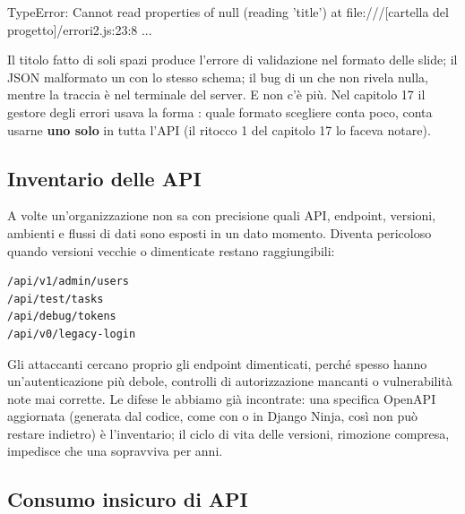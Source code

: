 \begin{console}
TypeError: Cannot read properties of null (reading 'title')
    at file:///[cartella del progetto]/errori2.js:23:8
    ...
\end{console}

Il titolo fatto di soli spazi produce l'errore di validazione nel formato delle
slide; il JSON malformato un  con lo stesso schema; il bug di
 un  che non rivela nulla, mentre la traccia è nel
terminale del server. E  non c'è più. Nel capitolo 17 il
gestore degli errori usava la forma : quale
formato scegliere conta poco, conta usarne \textbf{uno solo} in tutta l'API (il
ritocco 1 del capitolo 17 lo faceva notare).


\subsection{Inventario delle API}

A volte un'organizzazione non sa con precisione quali API, endpoint, versioni,
ambienti e flussi di dati sono esposti in un dato momento. Diventa pericoloso
quando versioni vecchie o dimenticate restano raggiungibili:

\begin{lstlisting}[style=plain, name=endpoint dimenticati]
/api/v1/admin/users
/api/test/tasks
/api/debug/tokens
/api/v0/legacy-login
\end{lstlisting}

Gli attaccanti cercano proprio gli endpoint dimenticati, perché spesso hanno
un'autenticazione più debole, controlli di autorizzazione mancanti o
vulnerabilità note mai corrette. Le difese le abbiamo già incontrate: una
specifica OpenAPI aggiornata (generata dal codice, come con 
o in Django Ninja, così non può restare indietro) è l'inventario; il ciclo di
vita delle versioni, rimozione compresa, impedisce che una  sopravviva
per anni.

\subsection{Consumo insicuro di API}

